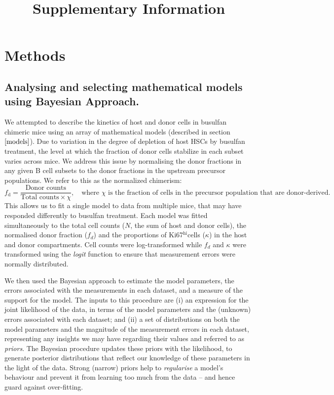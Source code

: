 \documentclass[11pt]{article}
\title{Supplementary Information}
\author{}
\date{}
\newcommand{\khi}{Ki67$^\text{hi}$}
\begin{document}
 
	\maketitle
	
\vspace{-2cm}
\section{Methods}
\subsection{Analysing and selecting mathematical models using Bayesian Approach.}

We attempted to describe the kinetics of host and donor cells in busulfan chimeric mice using an array of mathematical models (described in section $\ref{models}$).
Due to variation in the degree of depletion  of host HSCs by busulfan treatment, the level at which the fraction of donor cells stabilize in each subset varies across mice.
We address this issue by normalising the donor fractions in any given B cell subsets to the donor fractions in the upstream precursor populations. We refer to this as the normalized chimerism:
\vspace{-2mm}
$$
f_\text{d} = \frac{\text{Donor counts}}{\text{Total counts} \times \chi},  \quad \text{where } \chi \text{ is the fraction of cells in the precursor population that are donor-derived.}
$$
This allows us to fit a single model to data from multiple mice, that may have responded differently to busulfan treatment.
Each model was fitted simultaneously to the total cell counts ($N$, the sum of host and donor cells), the normalised donor fraction ($f_{d}$) and the proportions of \khi cells ($\kappa$) in the host and donor compartments.
Cell counts were log-transformed while $f_{d}$ and $\kappa$ were transformed using the \textit{logit} function to ensure that measurement errors were normally distributed.
  
We then used the Bayesian approach to estimate the model parameters,  the errors associated with the measurements in each dataset, and a measure of the support for the model.  The inputs to this procedure are (i) an expression for the joint likelihood of the data, in terms of the model parameters and the (unknown) errors associated with each dataset; and (ii) a set of distributions on both the model parameters and the magnitude of the measurement errors in each dataset, representing any insights we may have regarding their values and referred to as \textit{priors}.  The Bayesian procedure updates these priors with the likelihood, to generate posterior distributions that reflect our knowledge of these parameters in the light of the data. Strong (narrow)  priors  help to \textit{regularise} a model's behaviour and prevent it from learning too much from the data -- and hence guard against over-fitting. 
 
\end{document}
